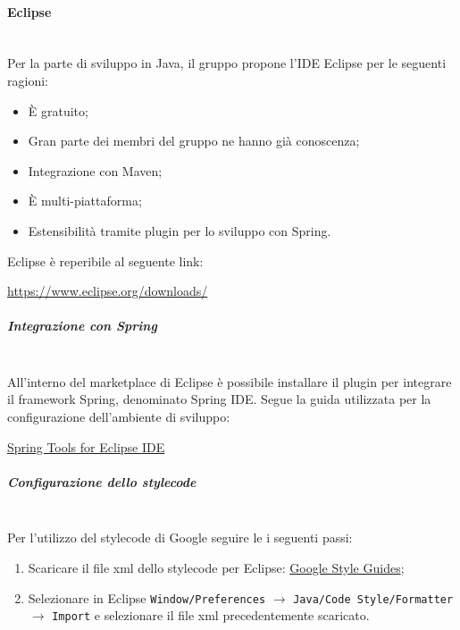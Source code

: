 \paragraph{Eclipse}\mbox{}\\
Per la parte di sviluppo in Java, il gruppo \gruppo propone l'IDE Eclipse per le seguenti ragioni:
\begin{itemize}
	\item \`E gratuito;
	\item Gran parte dei membri del gruppo ne hanno già conoscenza;
	\item Integrazione con Maven;
	\item \`E multi-piattaforma;
	\item Estensibilità tramite plugin per lo sviluppo con Spring.
\end{itemize}
Eclipse è reperibile al seguente link:\newline
\begin{center}
	\url{https://www.eclipse.org/downloads/}
\end{center}
\subparagraph{Integrazione con Spring} \mbox{}\\
All'interno del marketplace di Eclipse è possibile installare il plugin per integrare il framework Spring, denominato Spring IDE.
Segue la guida utilizzata per la configurazione dell'ambiente di sviluppo: 
\begin{center}
\href{https://www.eclipse.org/community/eclipse_newsletter/2018/february/springboot.php}{Spring Tools for Eclipse IDE}
\end{center}
\subparagraph{Configurazione dello stylecode}\mbox{}\\
Per l'utilizzo del stylecode di Google seguire le i seguenti passi:
\begin{enumerate}
\item Scaricare il file xml dello stylecode per Eclipse: \href{http://code.google.com/p/google-styleguide/}{Google Style Guides};
\item Selezionare in Eclipse \texttt{Window/Preferences} $\rightarrow$ \texttt{Java/Code Style/Formatter} $\rightarrow$ \texttt{Import} e selezionare il file xml precedentemente scaricato.
\end{enumerate}
